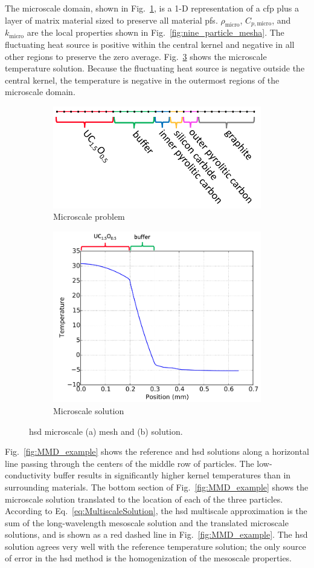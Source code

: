 The microscale domain, shown in Fig.\ \ref{fig:micro_a}, is a 1-D representation of a \gls{cfp} plus a layer of matrix material sized to preserve all material \glspl{pf}. \(\rho_\text{micro}\), \(C_{p,\text{micro}}\), and \(k_\text{micro}\) are the local properties shown in Fig.\ \ref{fig:nine_particle_mesha}. The fluctuating heat source is positive within the central kernel and negative in all other regions to preserve the zero average. Fig.\ \ref{fig:micro_b} shows the microscale temperature solution. Because the fluctuating heat source is negative outside the central kernel, the temperature is negative in the outermost regions of the microscale domain.

\begin{figure}[!h]
\centering
\begin{subfigure}[b]{0.49\linewidth}
\centering
\includegraphics[width=6.cm]{figs/microscale_domain_colored.png}
\vspace{2em}
\caption{Microscale problem}
\label{fig:micro_a}
\end{subfigure}
\begin{subfigure}[b]{0.49\linewidth}
\centering
\includegraphics[height=6.cm]{figs/microscale_solution.png}
\caption{Microscale solution}
\label{fig:micro_b}
\end{subfigure}
\caption{\gls{hsd} microscale (a) mesh and (b) solution.}
\end{figure}

Fig.\ \ref{fig:MMD_example} shows the reference and \gls{hsd} solutions along a horizontal line passing through the centers of the middle row of particles. The low-conductivity buffer results in significantly higher kernel temperatures than in surrounding materials. The bottom section of Fig.\ \ref{fig:MMD_example} shows the microscale solution translated to the location of each of the three particles. According to Eq.\ \eqref{eq:MultiscaleSolution}, the \gls{hsd} multiscale approximation is the sum of the long-wavelength mesoscale solution and the translated microscale solutions, and is shown as a red dashed line in Fig.\ \ref{fig:MMD_example}. The \gls{hsd} solution agrees very well with the reference temperature solution; the only source of error in the \gls{hsd} method is the homogenization of the mesoscale properties.

